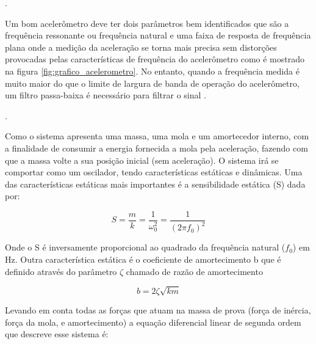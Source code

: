  .
\newpage



 Um bom acelerômetro deve ter dois parâmetros bem identificados que são a frequência ressonante ou frequência natural e uma faixa de resposta de frequência plana onde a medição da aceleração se torna mais precisa sem distorções provocadas pelas características de frequência do
acelerômetro como é mostrado na figura \ref{fig:grafico_acelerometro}. No entanto, quando a frequência medida é muito maior do que o limite de largura de banda de operação do acelerômetro, um filtro passa-baixa é necessário para filtrar o sinal \cite{ModernSensors}.
 
 
 .











Como o sistema apresenta uma massa, uma  mola e um amortecedor interno, com a finalidade de consumir a energia fornecida a mola pela aceleração, fazendo com que a massa volte a sua posição inicial (sem aceleração). O sistema irá se comportar como um oscilador, tendo características estáticas e dinâmicas. Uma das características estáticas mais importantes é a sensibilidade estática (S) dada por:


\begin{equation}
    S=\frac{m}{k} = \frac{1}{\omega_0^2} = \frac{1}{(2 \pi f_0)^2}
    \label{9.19_equacao_sensibilidade_estatica}
\end{equation} 

Onde o S é inversamente proporcional ao quadrado da frequência natural ($f_0$) em Hz. Outra característica estática é o coeficiente de amortecimento b que é definido através do parâmetro $\zeta$ chamado de razão de amortecimento

\begin{equation}
    b = 2 \zeta\sqrt{km}   
    \label{9.21_equacao_coeficiente_amortecimento}
\end{equation} 




Levando em conta todas as forças que atuam na massa de prova (força de inércia, força da mola, e amortecimento) a equação diferencial linear de segunda ordem que descreve esse sistema é:


